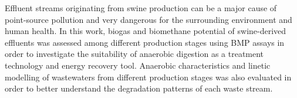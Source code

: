 Effluent streams originating from swine production can be a major cause of point-source pollution and very dangerous for the surrounding environment and human health. In this work, biogas and biomethane potential of swine-derived effluents was assessed among different production stages using BMP assays in order to investigate the suitability of anaerobic digestion as a treatment technology and energy recovery tool. Anaerobic characteristics and linetic modelling of wastewaters from different production stages was also evaluated in order to better understand the degradation patterns of each waste stream.